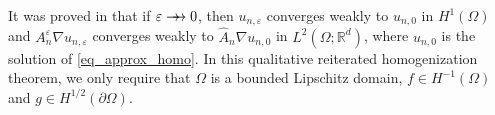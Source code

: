 \documentclass[reqno,12pt]{amsart} %
\theoremstyle{definition}
\theoremstyle{remark}
\numberwithin{equation}{section}
\newcommand{\e}{\varepsilon}
\newcommand{\doublerightarrow}{%
  \mathrel{%
    \mathchoice
      {\rightarrow\mspace{-10mu}\rightarrow} %
      {\rightarrow\mspace{-10mu}\rightarrow} %
      {\rightarrow\mspace{-10mu}\rightarrow} %
      {\rightarrow\mspace{-10mu}\rightarrow} %
  }%
}
\begin{document}
It was proved in \cite{Allaire1996Multiscale, Niu20_reiterated} that if $\e \doublerightarrow 0$, then
$u_{n, \varepsilon}$ converges weakly to $u_{n, 0}$ in $H^1(\Omega)$ and $A_n^\varepsilon \nabla u_{n, \varepsilon}$ converges weakly to $\widehat{A}_n\nabla u_{n, 0}$ in $L^2(\Omega; \mathbb{R}^d)$, where $u_{n, 0}$ is the solution of \eqref{eq_approx_homo}.
In this qualitative reiterated homogenization theorem, we only require that $\Omega$ is a bounded Lipschitz domain, $f\in H^{-1}(\Omega)$ and $g\in H^{1/2}(\partial\Omega)$.

\end{document}
